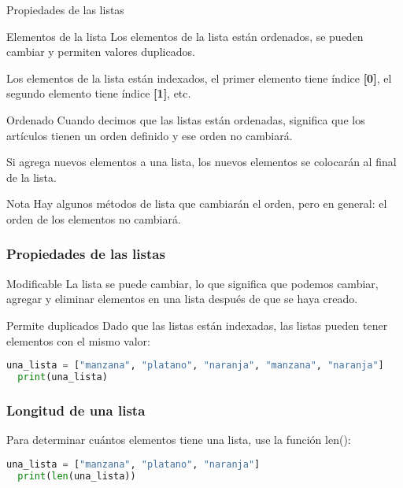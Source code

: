 \begin{frame}[c]{Propiedades de las listas}

  \begin{block}{Elementos de la lista}
    Los elementos de la lista están ordenados, se pueden cambiar
    y permiten valores duplicados.

    Los elementos de la lista están indexados, el primer elemento tiene
    índice \textbf{[0]}, el segundo elemento tiene índice \textbf{[1]}, etc.
  \end{block}

  \pausa
  \begin{block}{Ordenado}
    Cuando decimos que las listas están ordenadas, significa que los
    artículos tienen un orden definido y ese orden no cambiará.

    Si agrega nuevos elementos a una lista, los nuevos elementos se
    colocarán al final de la lista.
  \end{block}

  \begin{alertblock}{Nota}
    Hay algunos métodos de lista que cambiarán el orden,
    pero en general: el orden de los elementos no cambiará. 
  \end{alertblock}
\end{frame}

\begin{frame}[fragile]
  \frametitle{Propiedades de las listas}

  \begin{block}{Modificable}
    La lista se puede cambiar, lo que significa que podemos cambiar,
    agregar y eliminar elementos en una lista después de que se haya creado.
  \end{block}

  \pausa
  \begin{block}{Permite duplicados}
    Dado que las listas están indexadas, las listas pueden tener
    elementos con el mismo valor: 
  \end{block}

  \vspace{\baselineskip}
  \begin{lstlisting}[language=Python]
  una_lista = ["manzana", "platano", "naranja", "manzana", "naranja"]
  print(una_lista) 
  \end{lstlisting}
\end{frame}

\begin{frame}[fragile]
  \frametitle{Longitud de una lista}

  Para determinar cuántos elementos tiene una lista, use la función
  \textcolor{codeKeyword2}{len}():

  \vspace{\baselineskip}
  \begin{lstlisting}[language=Python]
  una_lista = ["manzana", "platano", "naranja"]
  print(len(una_lista)) 
  \end{lstlisting}
\end{frame}

